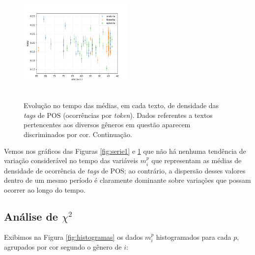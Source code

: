 \documentclass[10pt,a4paper,onecolumn]{article}
\theoremstyle{definition}
\theoremstyle{remark}
\begin{document}
\begin{figure}[htpb!]
\begin{multicols}{2}
	\end{multicols}%
	\includegraphics[width=0.5\textwidth]{graficos/VERB_no_tempo.png} \\  \\ \vspace{0.5cm}
	\caption{Evolução no tempo das médias, em cada texto, de densidade das \emph{tags} de POS (ocorrências por \emph{token}). Dados referentes a textos pertencentes aos diversos gêneros em questão aparecem discriminados por cor. Continuação.}
	\label{fig:serie2}
\end{figure}

Vemos nos gráficos das Figuras \ref{fig:serie1} e \ref{fig:serie2} que não há nenhuma tendência de variação considerável no tempo das variáveis $m^p_i$ que representam as médias de densidade de ocorrência de \emph{tags} de POS; ao contrário, a dispersão desses valores dentro de um mesmo período é claramente dominante sobre variações que possam ocorrer ao longo do tempo.

\subsection{Análise de $\chi^2$}
Exibimos na Figura \ref{fig:histogramas} os dados $m^p_i$ histogramados para cada $p$, agrupados por cor segundo o gênero de $i$:
\end{document}
